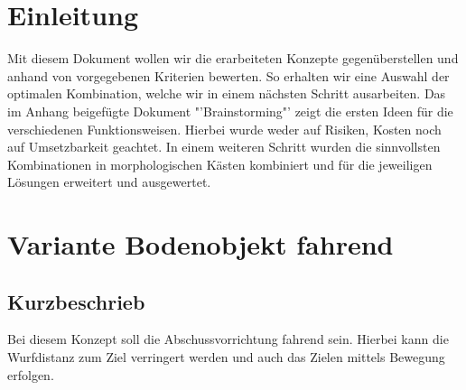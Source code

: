 \begin{landscape}
\pagestyle{empty}

\newcommand{\morphcellwidth}
{
0.12\linewidth
}
\section{Einleitung}
Mit diesem Dokument wollen wir die erarbeiteten Konzepte gegenüberstellen und anhand von vorgegebenen Kriterien bewerten. So erhalten wir eine Auswahl der optimalen Kombination, welche wir in einem nächsten Schritt ausarbeiten. 
Das im Anhang beigefügte Dokument "'Brainstorming"' zeigt die ersten Ideen für die verschiedenen Funktionsweisen. Hierbei wurde weder auf Risiken, Kosten noch auf Umsetzbarkeit geachtet. In einem weiteren Schritt wurden die sinnvollsten Kombinationen in morphologischen Kästen kombiniert und für die jeweiligen Lösungen erweitert und ausgewertet. 


\section{Variante Bodenobjekt fahrend}
\subsection{Kurzbeschrieb}
Bei diesem Konzept soll die Abschussvorrichtung fahrend sein. Hierbei kann die  Wurfdistanz zum Ziel verringert werden und auch das Zielen mittels Bewegung erfolgen.


\end{landscape}
